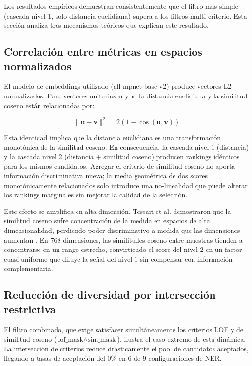 Los resultados empíricos demuestran consistentemente que el filtro más simple (cascada nivel 1, solo distancia euclidiana) supera a los filtros multi-criterio. Esta sección analiza tres mecanismos teóricos que explican este resultado.

\subsection{Correlación entre métricas en espacios normalizados}

El modelo de embeddings utilizado (all-mpnet-base-v2) produce vectores L2-normalizados. Para vectores unitarios $\mathbf{u}$ y $\mathbf{v}$, la distancia euclidiana y la similitud coseno están relacionadas por:

\begin{equation}
\|\mathbf{u} - \mathbf{v}\|^2 = 2(1 - \cos(\mathbf{u}, \mathbf{v}))
\label{eq:l2_cosine}
\end{equation}

Esta identidad implica que la distancia euclidiana es una transformación monotónica de la similitud coseno. En consecuencia, la cascada nivel 1 (distancia) y la cascada nivel 2 (distancia + similitud coseno) producen rankings idénticos para los mismos candidatos. Agregar el criterio de similitud coseno no aporta información discriminativa nueva; la media geométrica de dos scores monotónicamente relacionados solo introduce una no-linealidad que puede alterar los rankings marginales sin mejorar la calidad de la selección.

Este efecto se amplifica en alta dimensión. Tessari et al. demostraron que la similitud coseno sufre concentración de la medida en espacios de alta dimensionalidad, perdiendo poder discriminativo a medida que las dimensiones aumentan \cite{tessari2024diem}. En 768 dimensiones, las similitudes coseno entre muestras tienden a concentrarse en un rango estrecho, convirtiendo el score del nivel 2 en un factor cuasi-uniforme que diluye la señal del nivel 1 sin compensar con información complementaria.

\subsection{Reducción de diversidad por intersección restrictiva}

El filtro combinado, que exige satisfacer simultáneamente los criterios LOF y de similitud coseno ($\text{lof\_mask} \land \text{sim\_mask}$), ilustra el caso extremo de esta dinámica. La intersección de criterios reduce drásticamente el pool de candidatos aceptados, llegando a tasas de aceptación del 0\% en 6 de 9 configuraciones de NER.

